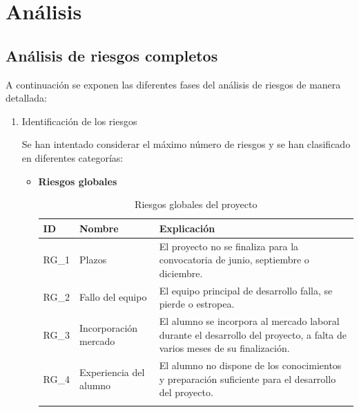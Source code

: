 \chapter{Análisis}
\section{Análisis de riesgos completos}
A continuación se exponen las diferentes fases del análisis de riesgos de manera detallada: 

\begin{enumerate}

\item Identificación de los riesgos

Se han intentado considerar el máximo número de riesgos y se han clasificado en diferentes categorías:

\begin{itemize}

\item \textbf{Riesgos globales}
\begingroup
\renewcommand\arraystretch{1.3}

\begin{longtable}{l p{5cm} p{9cm}}
\hline
\textbf{ID} & \textbf{Nombre} & \textbf{Explicación} \\
\hline
\endhead
\endfoot
RG\_1 & 
Plazos &
El proyecto no se finaliza para la convocatoria de junio, septiembre o diciembre.
 \\
RG\_2 & 
Fallo del equipo &
El equipo principal de desarrollo falla, se pierde o estropea. 
 \\
RG\_3 & 
Incorporación mercado &
El alumno se incorpora al mercado laboral durante el desarrollo del proyecto, a falta de varios meses de su finalización.
 \\
RG\_4 & 
Experiencia del alumno &
El alumno no dispone de los conocimientos y preparación suficiente para el desarrollo del proyecto. 
 \\
\hline
\caption{Riesgos globales del proyecto}\label{ries_glob}\\
\end{longtable}


\end{itemize}
\end{enumerate}
